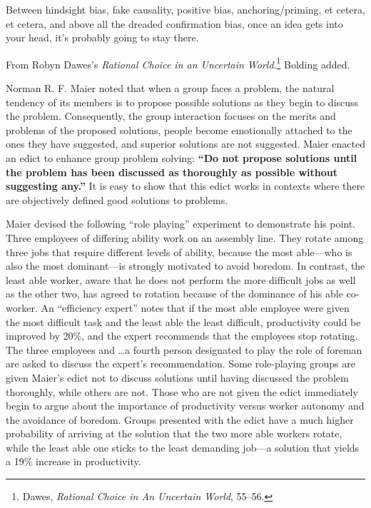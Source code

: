{
 Between hindsight bias, fake causality, positive bias,
anchoring/priming, et cetera, et cetera, and above all the dreaded
confirmation bias, once an idea gets into your head,
it's probably going to stay there.}

\myendsectiontext


\bigskip


{
 From Robyn Dawes's \textit{Rational Choice in an
Uncertain World}.\footnote{Dawes, \textit{Rational Choice in An Uncertain World}, 55--56.} Bolding added.}

{
 Norman R. F. Maier noted that when a group faces a problem, the
natural tendency of its members is to propose possible solutions as
they begin to discuss the problem. Consequently, the group interaction
focuses on the merits and problems of the proposed solutions, people
become emotionally attached to the ones they have suggested, and
superior solutions are not suggested. Maier enacted an edict to enhance
group problem solving: \textbf{``Do not propose
solutions until the problem has been discussed as thoroughly as
possible without suggesting any.''} It is easy to
show that this edict works in contexts where there are objectively
defined good solutions to problems.}

{
 Maier devised the following ``role
playing'' experiment to demonstrate his point. Three
employees of differing ability work on an assembly line. They rotate
among three jobs that require different levels of ability, because the
most able---who is also the most dominant---is strongly motivated to
avoid boredom. In contrast, the least able worker, aware that he does
not perform the more difficult jobs as well as the other two, has
agreed to rotation because of the dominance of his able co-worker. An
``efficiency expert'' notes that if
the most able employee were given the most difficult task and the least
able the least difficult, productivity could be improved by 20\%, and
the expert recommends that the employees stop rotating. The three
employees and \ldots a fourth person designated to play the role of
foreman are asked to discuss the expert's
recommendation. Some role-playing groups are given
Maier's edict not to discuss solutions until having
discussed the problem thoroughly, while others are not. Those who are
not given the edict immediately begin to argue about the importance of
productivity versus worker autonomy and the avoidance of boredom.
Groups presented with the edict have a much higher probability of
arriving at the solution that the two more able workers rotate, while
the least able one sticks to the least demanding job---a solution that
yields a 19\% increase in productivity.}

